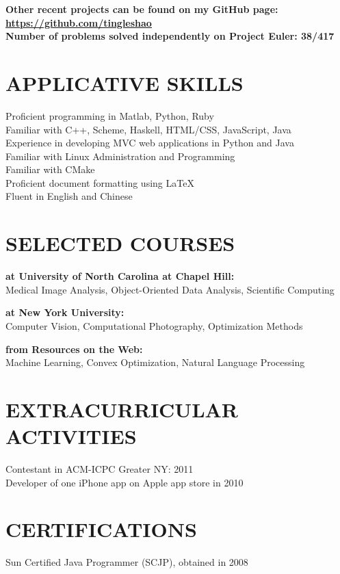 \documentclass{res}
\begin{document}
\begin{resume}
\begin{tabbing}
    {\bf Other recent projects can be found on my GitHub page: \href{https://github.com/tingleshao}{\underline{https://github.com/tingleshao}}}\\[0.3cm]
    {\bf Number of problems solved independently on Project Euler: 38/417}
  \end{tabbing}

\section{APPLICATIVE SKILLS}
    \vspace{0.05in}
    Proficient programming in Matlab, Python, Ruby  \\
    Familiar with C++, Scheme, Haskell, HTML/CSS, JavaScript, Java\\
    Experience in developing MVC web applications in Python and Java\\
    Familiar with Linux Administration and Programming \\
    Familiar with CMake\\
    Proficient document formatting using \LaTeX \\
    Fluent in English and Chinese

\section{SELECTED COURSES}
     \vspace{-0.05in}	
    \begin{tabbing}
    {\bf at University of North Carolina at Chapel Hill:}\\
    Medical Image Analysis, Object-Oriented Data Analysis, Scientific Computing \\
    \end{tabbing}\vspace{-30pt}
         \begin{tabbing}
    {\bf at New York University:}\\
    Computer Vision, Computational Photography, Optimization Methods\\
        \end{tabbing}\vspace{-30pt}
         \begin{tabbing}
    {\bf from Resources on the Web:}\\
    Machine Learning, Convex Optimization, Natural Language Processing
            \end{tabbing}


\section{EXTRACURRICULAR ACTIVITIES}
    \vspace{0.05in}
    Contestant in ACM-ICPC Greater NY: 2011\\
    Developer of one iPhone app on Apple app store in 2010

 \section{CERTIFICATIONS}
  \vspace{0.05in}
    Sun Certified Java Programmer (SCJP), obtained in 2008\\

\end{resume}
\end{document}
